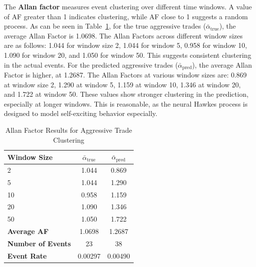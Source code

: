The \textbf{Allan factor} measures event clustering over different time windows. A value of AF greater than 1 indicates clustering, while AF close to 1 suggests a random process. As can be seen in Table~\ref{tb:allan-factor}, for the true aggressive trades ($\bar{\alpha}_\text{true}$), the average Allan Factor is 1.0698. The Allan Factors across different window sizes are as follows: 1.044 for window size 2, 1.044 for window 5, 0.958 for window 10, 1.090 for window 20, and 1.050 for window 50. This suggests consistent clustering in the actual events. For the predicted aggressive trades ($\bar{\alpha}_\text{pred}$), the average Allan Factor is higher, at 1.2687. The Allan Factors at various window sizes are: 0.869 at window size 2, 1.290 at window 5, 1.159 at window 10, 1.346 at window 20, and 1.722 at window 50. These values show stronger clustering in the prediction, especially at longer windows. This is reasonable, as the neural Hawkes process is designed to model self-exciting behavior especially.

\begin{table}[H]
    \centering
    \caption{Allan Factor Results for Aggressive Trade Clustering}
    \label{tb:allan-factor}
    \begin{tabular}{lcc}
    \toprule
    \textbf{Window Size} & $\bar{\alpha}_\text{true}$ & $\bar{\alpha}_\text{pred}$\\
    \midrule
    2   & 1.044 & 0.869 \\
    5   & 1.044 & 1.290 \\
    10  & 0.958 & 1.159 \\
    20  & 1.090 & 1.346 \\
    50  & 1.050 & 1.722 \\
    \midrule
    \textbf{Average AF} & 1.0698 & 1.2687 \\
    \textbf{Number of Events} & 23 & 38 \\
    \textbf{Event Rate} & 0.00297 & 0.00490 \\
    \bottomrule
    \end{tabular}
\end{table}

